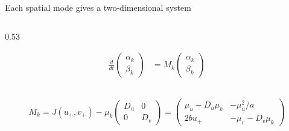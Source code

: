 \begin{frame}{Each spatial mode gives a two-dimensional system}
\begin{columns}[T,onlytextwidth]
\begin{column}{0.53\textwidth}
      \vspace{-0.24cm}

      {\color{HydraWhite}\fontsize{9.6}{12.1}\selectfont
      \begin{align*}
        \frac{d}{dt}
        \begin{pmatrix}
          \alpha_k
          \\
          \beta_k
        \end{pmatrix}
        &=
        M_k
        \begin{pmatrix}
          \alpha_k
          \\
          \beta_k
        \end{pmatrix}
      \end{align*}
      }

    \end{column}

  \end{columns}

  \vspace{-0.26cm}

  {\color{HydraWhite}\bfseries\fontsize{10.1}{12.8}\selectfont
  \begin{align*}
    \boxed{
      M_k
      =
      J(u_+,v_+)
      -
      \mu_k
      \begin{pmatrix}
        D_u&0
        \\
        0&D_v
      \end{pmatrix}
      =
      \begin{pmatrix}
        \mu_u-D_u\mu_k&-\mu_u^2/a
        \\
        2bu_+&-\mu_v-D_v\mu_k
      \end{pmatrix}
    }
  \end{align*}
  }

  \vspace{-0.40cm}


\end{frame}


